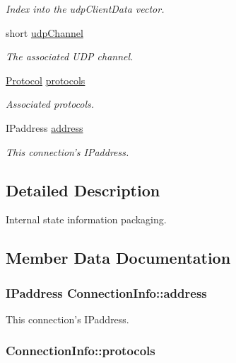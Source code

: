 \begin{DoxyCompactItemize}
\begin{DoxyCompactList}\small\item\em Index into the udp\-Client\-Data vector. \end{DoxyCompactList}\item 
short \hyperlink{structConnectionInfo_a04b5d2e6b358b6b9337b75dbeb01197e}{udp\-Channel}
\begin{DoxyCompactList}\small\item\em The associated U\-D\-P channel. \end{DoxyCompactList}\item 
\hyperlink{NetManager_8h_a9af285d1232beed01f31aac5d3a5469f}{Protocol} \hyperlink{structConnectionInfo_ad2f23f71b9b3e1a1ac56da62b7ef8ff0}{protocols}
\begin{DoxyCompactList}\small\item\em Associated protocols. \end{DoxyCompactList}\item 
I\-Paddress \hyperlink{structConnectionInfo_af014df0a6739ea51a6a532ec352f7848}{address}
\begin{DoxyCompactList}\small\item\em This connection's I\-Paddress. \end{DoxyCompactList}\end{DoxyCompactItemize}


\subsection{Detailed Description}
Internal state information packaging. 

\subsection{Member Data Documentation}
\hypertarget{structConnectionInfo_af014df0a6739ea51a6a532ec352f7848}{
\subsubsection[{address}]{\setlength{\rightskip}{0pt plus 5cm}I\-Paddress Connection\-Info\-::address}}\label{structConnectionInfo_af014df0a6739ea51a6a532ec352f7848}


This connection's I\-Paddress. 

\hypertarget{structConnectionInfo_ad2f23f71b9b3e1a1ac56da62b7ef8ff0}{
\subsubsection[{protocols}]{ Connection\-Info\-::protocols}}\label{structConnectionInfo_ad2f23f71b9b3e1a1ac56da62b7ef8ff0}


